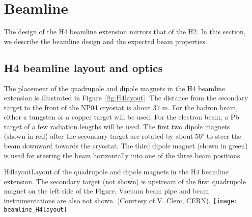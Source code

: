 \section{Beamline}
\label{sec:h4beamline}

The design of the H4 beamline extension mirrors that of the H2. In this section, we describe the beamline design and the expected beam properties.

\subsection{H4 beamline layout and optics}

The placement of the quadrupole and dipole magnets in the H4 beamline extension is illustrated in Figure~\ref{fig:H4layout}. The distance from the secondary target to the front of the NP04 cryostat is about 37 m. For the hadron beam, either a tungsten or a copper target will be used. For the electron beam, a Pb target of a few radiation lengths will be used. The first two dipole magnets (shown in red) after the secondary target are rotated by about 56$^\circ$ to steer the beam downward towards the cryostat. The third dipole magnet (shown in green) is used for steering the beam horizontally into one of the three beam positions.

\begin{cdrfigure}{H4layout}{Layout of the quadrupole and dipole magnets in the H4 beamline extension. The secondary target (not shown) is upstream of the first quadrupole magnet on the left side of the Figure. Vacuum beam pipe and beam instrumentations are also not shown. (Courtesy of V. Clerc, CERN).}
  \texttt{[image: beamline\_H4layout]}
\end{cdrfigure}

